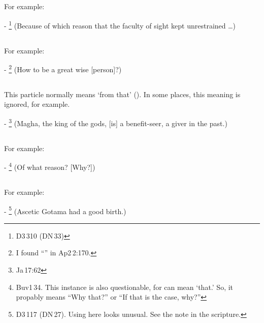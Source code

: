 \subsection*{}\label{nip:enadm}
For example:\par
- \footnote{D3\,310 (DN\,33)} (Because of which reason that the faculty of sight kept unrestrained \ldots) \par

\subsection*{}\label{nip:carahi}
For example:\par
- \footnote{I found ``'' in Ap2\,2:170.} (How to be a great wise [person]?) \par

\subsection*{}\label{nip:tato}
This particle normally means `from that' (). In some places, this meaning is ignored, for example.\par
- \footnote{Ja\,17:62} (Magha, the king of the gods, [is] a benefit-seer, a giver in the past.) \par

\subsection*{}\label{nip:tadm}
For example:\par
- \footnote{Buv1\,34. This instance is also questionable, for  can mean `that.' So, it propably means ``Why that?'' or ``If that is the case, why?''} (Of what reason? [Why?]) \par

\subsection*{}\label{nip:nadm}
For example:\par
- \footnote{D3\,117 (DN\,27). Using  here looks unusual. See the note in the scripture.} (Ascetic Gotama had a good birth.) \par

